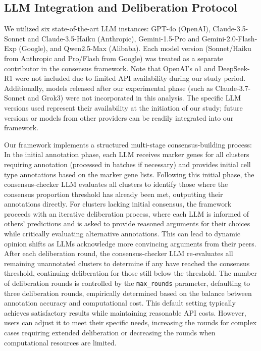 \documentclass[pdflatex,sn-nature]{sn-jnl}%
\theoremstyle{thmstyleone}%
\theoremstyle{thmstyletwo}%
\theoremstyle{thmstylethree}%
\begin{document}
\subsection{LLM Integration and Deliberation Protocol}

We utilized six state-of-the-art LLM instances: GPT-4o (OpenAI), Claude-3.5-Sonnet and Claude-3.5-Haiku (Anthropic), Gemini-1.5-Pro and Gemini-2.0-Flash-Exp (Google), and Qwen2.5-Max (Alibaba). Each model version (Sonnet/Haiku from Anthropic and Pro/Flash from Google) was treated as a separate contributor in the consensus framework. Note that OpenAI's o1 and DeepSeek-R1 were not included due to limited API availability during our study period. Additionally, models released after our experimental phase (such as Claude-3.7-Sonnet and Grok3) were not incorporated in this analysis. The specific LLM versions used represent their availability at the initiation of our study; future versions or models from other providers can be readily integrated into our framework.

Our framework implements a structured multi-stage consensus-building process: In the initial annotation phase, each LLM receives marker genes for all clusters requiring annotation (processed in batches if necessary) and provides initial cell type annotations based on the marker gene lists. Following this initial phase, the consensus-checker LLM evaluates all clusters to identify those where the consensus proportion threshold has already been met, outputting their annotations directly. For clusters lacking initial consensus, the framework proceeds with an iterative deliberation process, where each LLM is informed of others' predictions and is asked to provide reasoned arguments for their choices while critically evaluating alternative annotations. This can lead to dynamic opinion shifts as LLMs acknowledge more convincing arguments from their peers. After each deliberation round, the consensus-checker LLM re-evaluates all remaining unannotated clusters to determine if any have reached the consensus threshold, continuing deliberation for those still below the threshold. The number of deliberation rounds is controlled by the \texttt{max\_rounds} parameter, defaulting to three deliberation rounds, empirically determined based on the balance between annotation accuracy and computational cost. This default setting typically achieves satisfactory results while maintaining reasonable API costs. However, users can adjust it to meet their specific needs, increasing the rounds for complex cases requiring extended deliberation or decreasing the rounds when computational resources are limited.
\end{document}
